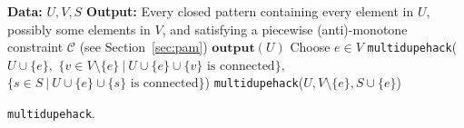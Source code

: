 \begin{algorithm}
  \begin{algorithmic}
    \STATE \textbf{Data:} $U, V, S$
    \STATE \textbf{Output:} Every closed pattern containing every
    element in $U$, possibly some elements in $V$, and satisfying a
    piecewise (anti)-monotone constraint $\mathcal{C}$ (see
    Section~\ref{sec:pam})
    \STATE $\mathbf{output}(U)$
    \ELSE
    \STATE Choose $e \in V$
    \STATE \texttt{multidupehack}($U \cup \{e\},$
    \STATE $\{v \in V \setminus \{e\} \: | \: U \cup \{e\} \cup
    \{v\}\text{ is connected}\},$
    \STATE $\{s \in S \: | \: U \cup \{e\} \cup \{s\}\text{ is
      connected}\}$)
    \STATE \texttt{multidupehack}($U , V \setminus \{e\}, S \cup
    \{e\}$)
    \ENDIF
    \ENDIF
  \end{algorithmic}
  \caption{\texttt{multidupehack}.}
  \label{alg:multidupehack}
\end{algorithm}
